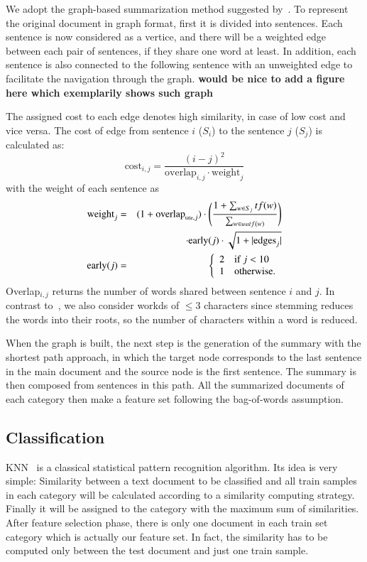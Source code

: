\documentclass{sigchi}
\begin{document}
We adopt the graph-based summarization method suggested by~\cite{sjobergh2006extraction}. 
To represent the original document in graph format, first it is divided into sentences. 
Each sentence is now considered as a vertice, and there will be a weighted edge between each pair of sentences, if they share one word at least.
In addition, each sentence is also connected to the following sentence with an unweighted edge to facilitate the navigation through the graph.
\textbf{would be nice to add a figure here which exemplarily shows such graph}

The assigned cost to each edge denotes high similarity, in case of low cost and vice versa. 
The cost of edge from sentence $i$ ($S_i$) to the sentence $j$ ($S_j$) is calculated as:
\begin{equation}
 \mbox{cost}_{i,j}=\frac{(i-j)^2}{\mbox{overlap}_{i,j}\cdot\mbox{weight}_j}
\end{equation}
with the weight of each sentence as 
\begin{eqnarray}
 \mbox{weight}_j&=&(1+\mbox{overlap}_{\mbox{\tiny title},j})\cdot\left(\frac{1+\sum_{w\in S_j}tf(w)}{\sum_{w\in\mbox{\tiny text}tf(w)}}\right)\nonumber\\
 &&\cdot\mbox{early}(j)\cdot\sqrt{1+|\mbox{edges}_j|}\\
 \mbox{early}(j)&=&\left\{\begin{array}{ll}
                         2 & \mbox{if }j<10\\
                         1 & \mbox{otherwise.}
                        \end{array}
\right.
\end{eqnarray}
Overlap$_{i,j}$ returns the number of words shared between sentence $i$ and $j$. 
In contrast to~\cite{sjobergh2006extraction}, we also consider workds of $\leq3$ characters since stemming reduces the words into their roots, so the number of characters within a word is reduced.

When the graph is built, the next step is the generation of the summary with the shortest path approach, in which the target node corresponds to the last sentence in the main document and the source node is the first sentence. 
The summary is then composed from sentences in this path. 
All the summarized documents of each category then make a feature set following the bag-of-words assumption.

\subsection{Classification}\label{sectionClassification}
KNN~\cite{5190062} is a classical statistical pattern recognition algorithm. 
Its idea is very simple: Similarity between a text document to be classified and all train samples in each category will be calculated according to a similarity computing strategy.
Finally it will be assigned to the category with the maximum sum of similarities.
After feature selection phase, there is only one document in each train set category which is actually our feature set. 
In fact, the similarity has to be computed only between the test document and just one train sample.
\end{document}
